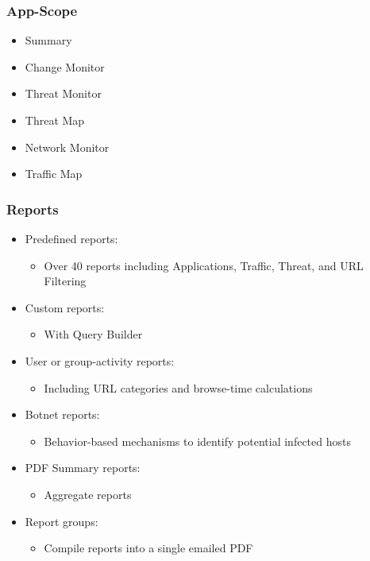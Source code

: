 \subsubsection{App-Scope}
\begin{itemize}
    \item Summary
    \item Change Monitor
    \item Threat Monitor
    \item Threat Map
    \item Network Monitor
    \item Traffic Map
\end{itemize}

\subsubsection{Reports}
\begin{itemize}
    \item Predefined reports:
        \begin{itemize}
            \item Over 40 reports including Applications, Traffic, Threat, and URL Filtering
        \end{itemize}
    \item Custom reports:
        \begin{itemize}
            \item With Query Builder
        \end{itemize}
    \item User or group-activity reports:
        \begin{itemize}
            \item Including URL categories and browse-time calculations
        \end{itemize}
    \item Botnet reports:
        \begin{itemize}
            \item Behavior-based mechanisms to identify potential infected hosts
        \end{itemize}
    \item PDF Summary reports:
        \begin{itemize}
            \item Aggregate reports
        \end{itemize}
    \item Report groups:
        \begin{itemize}
            \item Compile reports into a single emailed PDF
        \end{itemize}
\end{itemize}

